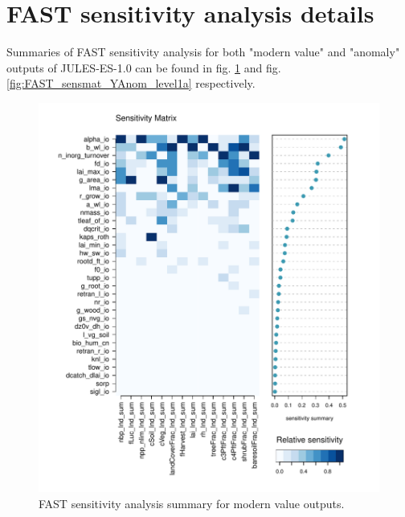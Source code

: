 \documentclass[gmd, manuscript]{copernicus}
\begin{document}
\section{FAST sensitivity analysis details}\label{app:sa_fast}

Summaries of FAST sensitivity analysis for both "modern value" and "anomaly" outputs of JULES-ES-1.0 can be found in fig. \ref{fig:FAST_sensmat_Y_level1a} and fig. \ref{fig:FAST_sensmat_YAnom_level1a} respectively.

\begin{figure}[t]
\includegraphics[width=12cm]{./graphics/FAST_sensmat_Y_level1a_wave01.pdf}
\caption{FAST sensitivity analysis summary for modern value outputs.}
\label{fig:FAST_sensmat_Y_level1a}
\end{figure}
\end{document}
